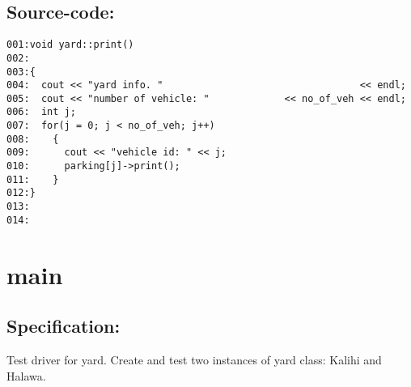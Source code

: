 \subsection*{Source-code:}
\begin{verbatim}
001:void yard::print()
002:
003:{
004:  cout << "yard info. "                                  << endl;
005:  cout << "number of vehicle: "             << no_of_veh << endl;
006:  int j;
007:  for(j = 0; j < no_of_veh; j++)
008:    {
009:      cout << "vehicle id: " << j;
010:      parking[j]->print();
011:    }
012:}
013:
014:
\end{verbatim}
\section{main}
\subsection*{Specification:}
Test driver for yard. Create and test two instances of
  yard class: Kalihi and Halawa.
